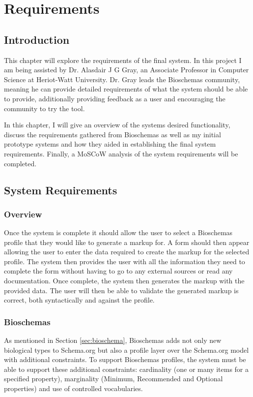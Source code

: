 
\chapter{Requirements} 
{

\section{Introduction}
This chapter will explore the requirements of the final system. In this project I am being assisted by Dr. Alasdair J G Gray, an Associate Professor in Computer Science at Heriot-Watt University. Dr. Gray leads the Bioschemas community, meaning he can provide detailed requirements of what the system should be able to provide, additionally providing feedback as a user and encouraging the community to try the tool. \par

In this chapter, I will give an overview of the systems desired functionality, discuss the requirements gathered from Bioschemas as well as my initial prototype systems and how they aided in establishing the final system requirements. Finally, a MoSCoW analysis of the system requirements will be completed. 

\section{System Requirements}
\subsection{Overview}
Once the system is complete it should allow the user to select a Bioschemas profile that they would like to generate a markup for. A form should then appear allowing the user to enter the data required to create the markup for the selected profile. The system then provides the user with all the information they need to complete the form without having to go to any external sources or read any documentation. Once complete, the system then generates the markup with the provided data. The user will then be able to validate the generated markup is correct, both syntactically and against the profile.

}

\subsection{Bioschemas}
\label{sec:bioschemaRequirements}
As mentioned in Section \ref{sec:bioschema}, Bioschemas adds not only new biological types to Schema.org but also a profile layer over the Schema.org model with additional constraints. To support Bioschemas profiles, the system must be able to support these additional constraints: cardinality (one or many items for a specified property), marginality (Minimum, Recommended and Optional properties) and use of controlled vocabularies. 


